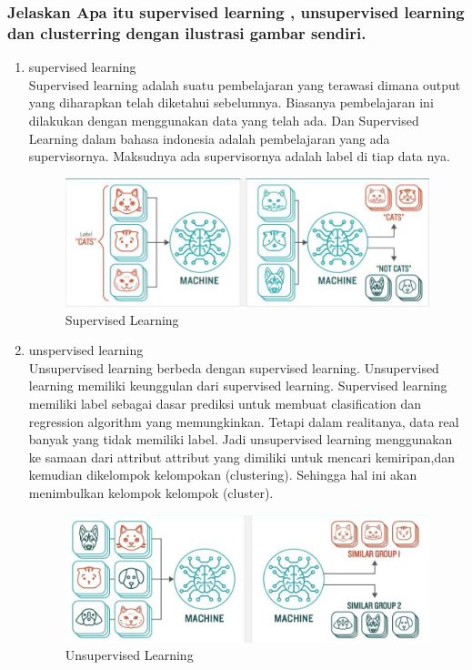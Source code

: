 \subsubsection{Jelaskan Apa itu supervised learning , unsupervised learning dan clusterring dengan ilustrasi gambar sendiri.}
\begin{enumerate}
\item supervised learning
\hfill\\
Supervised learning adalah suatu pembelajaran yang terawasi dimana output yang diharapkan telah diketahui sebelumnya. Biasanya pembelajaran ini dilakukan dengan menggunakan data yang telah ada. Dan Supervised Learning dalam bahasa indonesia adalah pembelajaran yang ada supervisornya. Maksudnya  ada supervisornya adalah label di tiap data nya. 
\begin{figure}[H]
    \includegraphics[width=12cm]{figures/1174087/2/sl.png}
    \centering
    \caption{Supervised Learning}
\end{figure}

\item unspervised learning
\hfill\\
Unsupervised learning berbeda dengan supervised learning. Unsupervised learning memiliki keunggulan dari supervised learning. Supervised learning memiliki label sebagai dasar prediksi untuk membuat clasification dan regression algorithm yang memungkinkan. Tetapi dalam realitanya, data real banyak yang tidak memiliki label. Jadi unsupervised learning menggunakan ke samaan dari attribut attribut yang dimiliki untuk mencari kemiripan,dan kemudian dikelompok kelompokan (clustering). Sehingga hal ini akan menimbulkan kelompok kelompok (cluster). 
\begin{figure}[H]
    \includegraphics[width=12cm]{figures/1174087/2/ul.png}
    \centering
    \caption{Unsupervised Learning}
\end{figure}


\end{enumerate}
